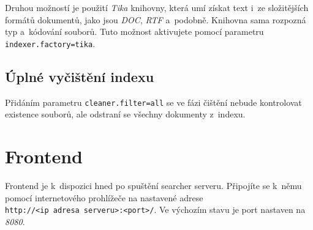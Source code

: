 Druhou možností je použití \emph{Tika} knihovny, která umí získat text i~ze složitějších formátů dokumentů, jako jsou \emph{DOC}, \emph{RTF} a~podobně. Knihovna sama rozpozná typ a~kódování souborů. Tuto možnost aktivujete pomocí parametru \verb|indexer.factory=tika|.

\subsection{Úplné vyčištění indexu}
Přidáním parametru \verb|cleaner.filter=all| se ve fázi čištění nebude kontrolovat existence souborů, ale odstraní se všechny dokumenty z~indexu.

\section{Frontend}
Frontend je k~dispozici hned po spuštění searcher serveru. Připojíte se k~němu pomocí internetového prohlížeče na nastavené adrese \\ \verb|http://<ip adresa serveru>:<port>/|. Ve výchozím stavu je port nastaven na \emph{8080}.